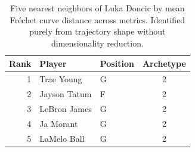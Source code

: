 \begin{table}[htbp]
  \centering\small
  \begin{tabular}{rllc}
    \toprule
    Rank & Player & Position & Archetype \\
    \midrule
    1 & Trae Young & G & 2 \\
    2 & Jayson Tatum & F & 2 \\
    3 & LeBron James & G & 2 \\
    4 & Ja Morant & G & 2 \\
    5 & LaMelo Ball & G & 2 \\
    \bottomrule
  \end{tabular}
  \caption{Five nearest neighbors of Luka Doncic by mean Fr\'{e}chet curve distance across metrics. Identified purely from trajectory shape without dimensionality reduction.}
  \label{tab:Luka_Doncic_frechet_curve_neighbors}
\end{table}

